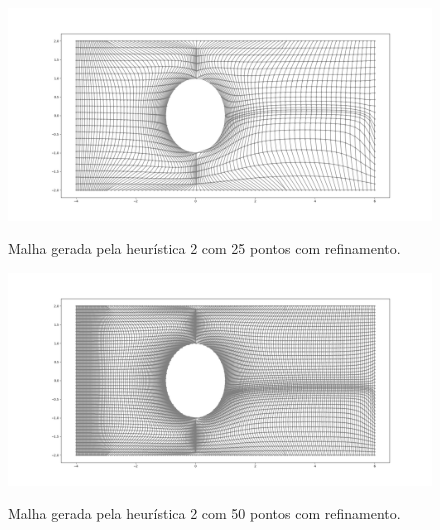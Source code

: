 \documentclass[a4paper]{article}
\begin{document}
%



\begin{figure}[H]
	\centering
	\includegraphics[width=1.0\textwidth]{heuristica_2_25pts_refined.png}
	\label{fig:heuristic2_50pts_refined} 
	\caption[caption]{Malha gerada pela heurística 2 com 25 pontos com refinamento.}
\end{figure}

\begin{figure}[H]
	\centering
	\includegraphics[width=1.0\textwidth]{heuristica_2_50pts_refined.png}
	\label{fig:heuristic2_100pts_refined} 
	\caption[caption]{Malha gerada pela heurística 2 com 50 pontos com refinamento.}
\end{figure}
\end{document}
